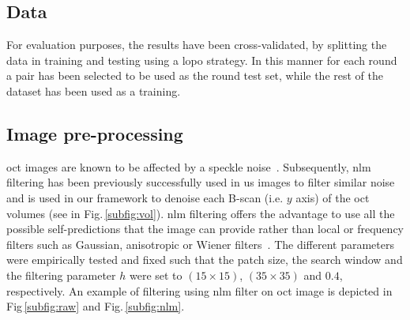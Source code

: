 \subsection{Data}
\color{red}{
  \begin{itemize}
  \item cross-validation
  \item our dataset
  \item DUC dataset
  \end{itemize}}\color{black}

For evaluation purposes, the results have been cross-validated, by splitting the data in training and testing using a \ac{lopo} strategy. In this manner for each round a pair \color{red}{dce,normal} has been selected to be used as the round test set, while the rest of the dataset has been used as a training. \color{black}

\color{red}{The dataset blablablabal...}\color{black}
\color{red}{The duc dataset blabla bla...}\color{black}

\subsection{Image pre-processing}

\Ac{oct} images are known to be affected by a speckle noise~\cite{schmitt1999speckle}.
Subsequently, \ac{nlm}~\cite{buades2005non} filtering has been previously successfully used in \ac{us} images to filter similar noise~\cite{Coupe2009} and is used in our framework to denoise each B-scan (i.e. $y$ axis) of the  \ac{oct} volumes (see in Fig.\,\ref{subfig:vol}).
\ac{nlm} filtering offers the advantage to use all the possible self-predictions that the image can provide rather than local or frequency filters such as Gaussian, anisotropic or Wiener filters~\cite{buades2005non}.
The different parameters were empirically tested and fixed such that the patch size, the search window and the filtering parameter $h$ were set to $(15 \times 15)$, $(35 \times 35)$ and $0.4$, respectively.
An example of filtering using \ac{nlm} filter on \ac{oct} image is depicted in Fig\,\ref{subfig:raw} and Fig.\,\ref{subfig:nlm}.

